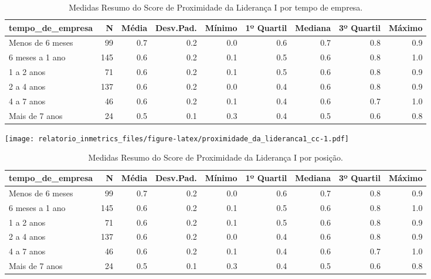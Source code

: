 \documentclass[]{book}
\begin{document}
\begin{table}[t]

\caption{\label{tab:unnamed-chunk-24}Medidas Resumo do Score de Proximidade da Liderança I por tempo de empresa.}
\centering
\fontsize{7}{9}\selectfont
\begin{tabular}{lrrrrrrrr}
\toprule
tempo\_de\_empresa & N & Média & Desv.Pad. & Mínimo & 1º Quartil & Mediana & 3º Quartil & Máximo\\
\midrule
Menos de 6 meses & 99 & 0.7 & 0.2 & 0.0 & 0.6 & 0.7 & 0.8 & 0.9\\
6 meses a 1 ano & 145 & 0.6 & 0.2 & 0.1 & 0.5 & 0.6 & 0.8 & 1.0\\
1 a 2 anos & 71 & 0.6 & 0.2 & 0.1 & 0.5 & 0.6 & 0.8 & 0.9\\
2 a 4 anos & 137 & 0.6 & 0.2 & 0.0 & 0.4 & 0.6 & 0.8 & 0.9\\
4 a 7 anos & 46 & 0.6 & 0.2 & 0.1 & 0.4 & 0.6 & 0.7 & 1.0\\
\addlinespace
Mais de 7 anos & 24 & 0.5 & 0.1 & 0.3 & 0.4 & 0.5 & 0.6 & 0.8\\
\bottomrule
\end{tabular}
\end{table}

\texttt{[image: relatorio\_inmetrics\_files/figure-latex/proximidade\_da\_lideranca1\_cc-1.pdf]}

\begin{table}[t]

\caption{\label{tab:unnamed-chunk-25}Medidas Resumo do Score de Proximidade da Liderança I por posição.}
\centering
\fontsize{7}{9}\selectfont
\begin{tabular}{lrrrrrrrr}
\toprule
tempo\_de\_empresa & N & Média & Desv.Pad. & Mínimo & 1º Quartil & Mediana & 3º Quartil & Máximo\\
\midrule
Menos de 6 meses & 99 & 0.7 & 0.2 & 0.0 & 0.6 & 0.7 & 0.8 & 0.9\\
6 meses a 1 ano & 145 & 0.6 & 0.2 & 0.1 & 0.5 & 0.6 & 0.8 & 1.0\\
1 a 2 anos & 71 & 0.6 & 0.2 & 0.1 & 0.5 & 0.6 & 0.8 & 0.9\\
2 a 4 anos & 137 & 0.6 & 0.2 & 0.0 & 0.4 & 0.6 & 0.8 & 0.9\\
4 a 7 anos & 46 & 0.6 & 0.2 & 0.1 & 0.4 & 0.6 & 0.7 & 1.0\\
\addlinespace
Mais de 7 anos & 24 & 0.5 & 0.1 & 0.3 & 0.4 & 0.5 & 0.6 & 0.8\\
\bottomrule
\end{tabular}
\end{table}
\end{document}
